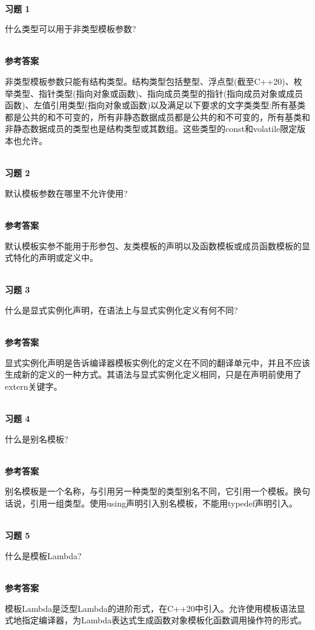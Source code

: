 \hspace*{\fill} \\ %
\noindent
\textbf{习题 1}

什么类型可以用于非类型模板参数?

\hspace*{\fill} \\ %
\noindent
\textbf{参考答案}

非类型模板参数只能有结构类型。结构类型包括整型、浮点型(截至C++20)、枚举类型、指针类型(指向对象或函数)、指向成员类型的指针(指向成员对象或成员函数)、左值引用类型(指向对象或函数)以及满足以下要求的文字类类型:所有基类都是公共的和不可变的，所有非静态数据成员都是公共的和不可变的，所有基类和非静态数据成员的类型也是结构类型或其数组。这些类型的const和volatile限定版本也允许。


\hspace*{\fill} \\ %
\noindent
\textbf{习题 2}

默认模板参数在哪里不允许使用?

\hspace*{\fill} \\ %
\noindent
\textbf{参考答案}

默认模板实参不能用于形参包、友类模板的声明以及函数模板或成员函数模板的显式特化的声明或定义中。

\hspace*{\fill} \\ %
\noindent
\textbf{习题 3}

什么是显式实例化声明，在语法上与显式实例化定义有何不同?

\hspace*{\fill} \\ %
\noindent
\textbf{参考答案}

显式实例化声明是告诉编译器模板实例化的定义在不同的翻译单元中，并且不应该生成新的定义的一种方式。其语法与显式实例化定义相同，只是在声明前使用了extern关键字。

\hspace*{\fill} \\ %
\noindent
\textbf{习题 4}

什么是别名模板?

\hspace*{\fill} \\ %
\noindent
\textbf{参考答案}

别名模板是一个名称，与引用另一种类型的类型别名不同，它引用一个模板。换句话说，引用一组类型。使用using声明引入别名模板，不能用typedef声明引入。

\hspace*{\fill} \\ %
\noindent
\textbf{习题 5}

什么是模板Lambda?

\hspace*{\fill} \\ %
\noindent
\textbf{参考答案}

模板Lambda是泛型Lambda的进阶形式，在C++20中引入。允许使用模板语法显式地指定编译器，为Lambda表达式生成函数对象模板化函数调用操作符的形式。












